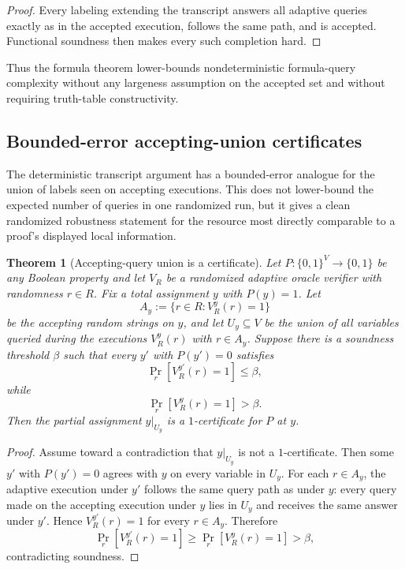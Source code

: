 \documentclass[11pt]{article}
\newtheorem{theorem}{Theorem}[section]
\theoremstyle{definition}
\newcommand{\bits}{\{0,1\}}
\begin{document}
\begin{proof}
Every labeling extending the transcript answers all adaptive queries exactly as in the accepted execution, follows the same path, and is accepted.  Functional soundness then makes every such completion hard.
\end{proof}

Thus the formula theorem lower-bounds nondeterministic formula-query complexity without any largeness assumption on the accepted set and without requiring truth-table constructivity.

\subsection{Bounded-error accepting-union certificates}

The deterministic transcript argument has a bounded-error analogue for the union of labels seen on accepting executions.  This does not lower-bound the expected number of queries in one randomized run, but it gives a clean randomized robustness statement for the resource most directly comparable to a proof's displayed local information.

\begin{theorem}[Accepting-query union is a certificate]\label{thm:accepting-union}
Let \(P:\bits^V\to\bits\) be any Boolean property and let \(V_R\) be a randomized adaptive oracle verifier with randomness \(r\in R\).  Fix a total assignment \(y\) with \(P(y)=1\).  Let
\[
  A_y:=\{r\in R: V_R^y(r)=1\}
\]
be the accepting random strings on \(y\), and let \(U_y\subseteq V\) be the union of all variables queried during the executions \(V_R^y(r)\) with \(r\in A_y\).  Suppose there is a soundness threshold \(\beta\) such that every \(y'\) with \(P(y')=0\) satisfies
\[
  \Pr_r[V_R^{y'}(r)=1]\le \beta,
\]
while
\[
  \Pr_r[V_R^y(r)=1]>\beta.
\]
Then the partial assignment \(y|_{U_y}\) is a \(1\)-certificate for \(P\) at \(y\).
\end{theorem}

\begin{proof}
Assume toward a contradiction that \(y|_{U_y}\) is not a \(1\)-certificate.  Then some \(y'\) with \(P(y')=0\) agrees with \(y\) on every variable in \(U_y\).  For each \(r\in A_y\), the adaptive execution under \(y'\) follows the same query path as under \(y\): every query made on the accepting execution under \(y\) lies in \(U_y\) and receives the same answer under \(y'\).  Hence \(V_R^{y'}(r)=1\) for every \(r\in A_y\).  Therefore
\[
  \Pr_r[V_R^{y'}(r)=1]
  \ge
  \Pr_r[V_R^y(r)=1]
  >\beta,
\]
contradicting soundness.
\end{proof}
\end{document}
